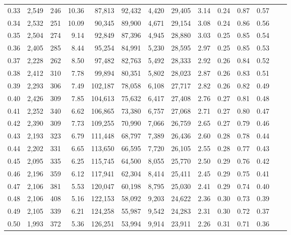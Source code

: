 \begin{tabular}{rrrrrrrrrrrrrr}
0.33 &  2,549 &  246 &   10.36 &   87,813 &   92,432 &   4,420 &  29,405 &  3.14 &  0.24 &  0.87 &      0.57 \\
0.34 &  2,532 &  251 &   10.09 &   90,345 &   89,900 &   4,671 &  29,154 &  3.08 &  0.24 &  0.86 &      0.56 \\
0.35 &  2,504 &  274 &    9.14 &   92,849 &   87,396 &   4,945 &  28,880 &  3.03 &  0.25 &  0.85 &      0.54 \\
0.36 &  2,405 &  285 &    8.44 &   95,254 &   84,991 &   5,230 &  28,595 &  2.97 &  0.25 &  0.85 &      0.53 \\
0.37 &  2,228 &  262 &    8.50 &   97,482 &   82,763 &   5,492 &  28,333 &  2.92 &  0.26 &  0.84 &      0.52 \\
0.38 &  2,412 &  310 &    7.78 &   99,894 &   80,351 &   5,802 &  28,023 &  2.87 &  0.26 &  0.83 &      0.51 \\
0.39 &  2,293 &  306 &    7.49 &  102,187 &   78,058 &   6,108 &  27,717 &  2.82 &  0.26 &  0.82 &      0.49 \\
0.40 &  2,426 &  309 &    7.85 &  104,613 &   75,632 &   6,417 &  27,408 &  2.76 &  0.27 &  0.81 &      0.48 \\
0.41 &  2,252 &  340 &    6.62 &  106,865 &   73,380 &   6,757 &  27,068 &  2.71 &  0.27 &  0.80 &      0.47 \\
0.42 &  2,390 &  309 &    7.73 &  109,255 &   70,990 &   7,066 &  26,759 &  2.65 &  0.27 &  0.79 &      0.46 \\
0.43 &  2,193 &  323 &    6.79 &  111,448 &   68,797 &   7,389 &  26,436 &  2.60 &  0.28 &  0.78 &      0.44 \\
0.44 &  2,202 &  331 &    6.65 &  113,650 &   66,595 &   7,720 &  26,105 &  2.55 &  0.28 &  0.77 &      0.43 \\
0.45 &  2,095 &  335 &    6.25 &  115,745 &   64,500 &   8,055 &  25,770 &  2.50 &  0.29 &  0.76 &      0.42 \\
0.46 &  2,196 &  359 &    6.12 &  117,941 &   62,304 &   8,414 &  25,411 &  2.45 &  0.29 &  0.75 &      0.41 \\
0.47 &  2,106 &  381 &    5.53 &  120,047 &   60,198 &   8,795 &  25,030 &  2.41 &  0.29 &  0.74 &      0.40 \\
0.48 &  2,106 &  408 &    5.16 &  122,153 &   58,092 &   9,203 &  24,622 &  2.36 &  0.30 &  0.73 &      0.39 \\
0.49 &  2,105 &  339 &    6.21 &  124,258 &   55,987 &   9,542 &  24,283 &  2.31 &  0.30 &  0.72 &      0.37 \\
0.50 &  1,993 &  372 &    5.36 &  126,251 &   53,994 &   9,914 &  23,911 &  2.26 &  0.31 &  0.71 &      0.36 \\

\end{tabular}
